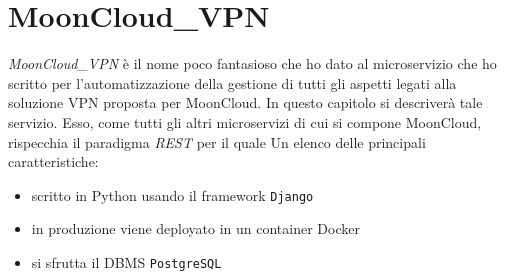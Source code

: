 \chapter{MoonCloud\_VPN}\label{ch:microservice}
\textit{MoonCloud\_VPN} è il nome poco fantasioso che ho dato al microservizio
che ho scritto per l'automatizzazione della gestione di tutti gli aspetti legati
alla soluzione VPN proposta per MoonCloud. In questo capitolo si descriverà tale
servizio.
Esso, come tutti gli altri microservizi di cui si compone MoonCloud, rispecchia
il paradigma \textit{REST} per il quale %
Un elenco delle principali caratteristiche:
\begin{itemize}
  \item scritto in Python usando il framework \texttt{Django}
  \item in produzione viene deployato in un container Docker
  \item si sfrutta il DBMS \texttt{PostgreSQL}
\end{itemize}



